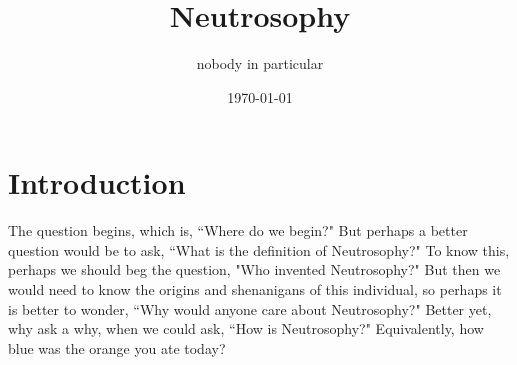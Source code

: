 \documentclass[11pt]{article}
\title{Neutrosophy}
\author{nobody in particular}
\date{\today}
\begin{document}
\maketitle

\section{Introduction}
The question begins, which is, ``Where do we begin?" But perhaps a better question would be to ask, ``What is the definition of Neutrosophy?" To know this, perhaps we should beg the question, "Who invented Neutrosophy?" But then we would need to know the origins and shenanigans of this individual, so perhaps it is better to wonder, ``Why would anyone care about Neutrosophy?" Better yet, why ask a why, when we could ask, ``How is Neutrosophy?" Equivalently, how blue was the orange you ate today?
\end{document}
